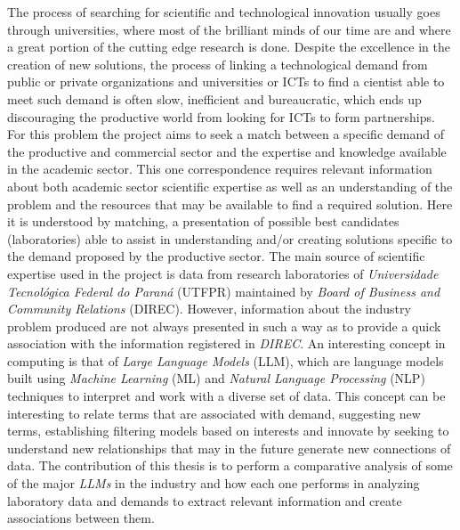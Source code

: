 \begin{abstractutfpr}
    The process of searching for scientific and technological innovation usually goes through universities, where most of the brilliant minds of our time are and where a great portion of the cutting edge research is done. Despite the excellence in the creation of new solutions, the process of linking a technological demand from public or private organizations and universities or ICTs to find a cientist able to meet such demand is often slow, inefficient and bureaucratic, which ends up discouraging the productive world from looking for ICTs to form partnerships. For this problem the project aims to seek a match between a specific demand of the productive and commercial sector and the expertise and knowledge available in the academic sector. This one correspondence requires relevant information about both academic sector scientific expertise as well as an understanding of the problem and the resources that may be available to find a required solution. Here it is understood by matching, a presentation of possible best candidates (laboratories) able to assist in understanding and/or creating solutions specific to the demand proposed by the productive sector. The main source of scientific expertise used in the project is data from research laboratories of \emph{Universidade Tecnológica Federal do Paraná} (UTFPR) maintained by \emph{Board of Business and Community Relations} (DIREC). However, information about the industry problem produced are not always presented in such a way as to provide a quick association with the information registered in \emph{DIREC}.
    An interesting concept in computing is that of \emph{Large Language Models} (LLM), which are language models built using \emph{Machine Learning} (ML) and \emph{Natural Language Processing} (NLP) techniques to interpret and work with a diverse set of data. This concept can be interesting to relate terms that are associated with demand, suggesting new terms, establishing filtering models based on interests and innovate by seeking to understand new relationships that may in the future generate new connections of data. The contribution of this thesis is to perform a comparative analysis of some of the major \emph{LLMs} in the industry and how each one performs in analyzing laboratory data and demands to extract relevant information and create associations between them.
\end{abstractutfpr}
